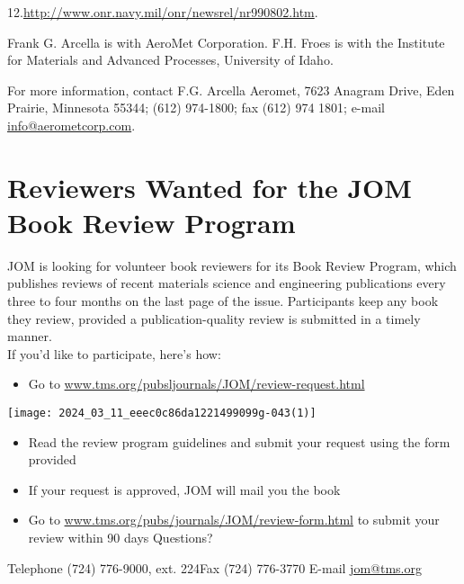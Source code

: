 \documentclass[10pt]{article}
\begin{document}
12.\href{http://www.onr.navy.mil/onr/newsrel/nr990802.htm}{http://www.onr.navy.mil/onr/newsrel/nr990802.htm}.

Frank G. Arcella is with AeroMet Corporation. F.H. Froes is with the Institute for Materials and Advanced Processes, University of Idaho.

For more information, contact F.G. Arcella Aeromet, 7623 Anagram Drive, Eden Prairie, Minnesota 55344; (612) 974-1800; fax (612) 974 1801; e-mail \href{mailto:info@aerometcorp.com}{info@aerometcorp.com}.

\section*{Reviewers Wanted for the JOM Book Review Program}
JOM is looking for volunteer book reviewers for its Book Review Program, which publishes reviews of recent materials science and engineering publications every three to four months on the last page of the issue. Participants keep any book they review, provided a publication-quality review is submitted in a timely manner.\\
If you'd like to participate, here's how:

\begin{itemize}
  \item Go to \href{http://www.tms.org/pubsljournals/JOM/review-request.html}{www.tms.org/pubsljournals/JOM/review-request.html}
\end{itemize}

\begin{center}
\texttt{[image: 2024\_03\_11\_eeec0c86da1221499099g-043(1)]}
\end{center}

\begin{itemize}
  \item Read the review program guidelines and submit your request using the form provided

  \item If your request is approved, JOM will mail you the book

  \item Go to \href{http://www.tms.org/pubs/journals/JOM/review-form.html}{www.tms.org/pubs/journals/JOM/review-form.html} to submit your review within 90 days Questions?

\end{itemize}

Telephone (724) 776-9000, ext. 224Fax (724) 776-3770 E-mail \href{mailto:jom@tms.org}{jom@tms.org}
\end{document}
